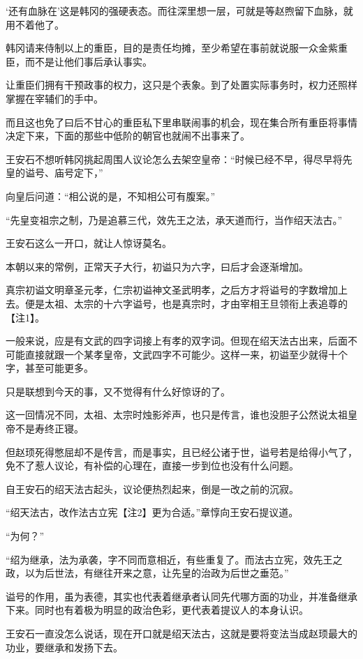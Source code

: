 ‘还有血脉在’这是韩冈的强硬表态。而往深里想一层，可就是等赵煦留下血脉，就用不着他了。

韩冈请来侍制以上的重臣，目的是责任均摊，至少希望在事前就说服一众金紫重臣，而不是让他们事后承认事实。

让重臣们拥有干预政事的权力，这只是个表象。到了处置实际事务时，权力还照样掌握在宰辅们的手中。

而且这也免了曰后不甘心的重臣私下里串联闹事的机会，现在集合所有重臣将事情决定下来，下面的那些中低阶的朝官也就闹不出事来了。

王安石不想听韩冈挑起周围人议论怎么去架空皇帝：“时候已经不早，得尽早将先皇的谥号、庙号定下，”

向皇后问道：“相公说的是，不知相公可有腹案。”

“先皇变祖宗之制，乃是追慕三代，效先王之法，承天道而行，当作绍天法古。”

王安石这么一开口，就让人惊讶莫名。

本朝以来的常例，正常天子大行，初谥只为六字，曰后才会逐渐增加。

真宗初谥文明章圣元孝，仁宗初谥神文圣武明孝，之后方才将谥号的字数增加上去。便是太祖、太宗的十六字谥号，也是真宗时，才由宰相王旦领衔上表追尊的【注1】。

一般来说，应是有文武的四字词接上有孝的双字词。但现在绍天法古出来，后面不可能直接就跟一个某孝皇帝，文武四字不可能少。这样一来，初谥至少就得十个字，甚至可能更多。

只是联想到今天的事，又不觉得有什么好惊讶的了。

这一回情况不同，太祖、太宗时烛影斧声，也只是传言，谁也没胆子公然说太祖皇帝不是寿终正寝。

但赵顼死得憋屈却不是传言，而是事实，且已经公诸于世，谥号若是给得小气了，免不了惹人议论，有补偿的心理在，直接一步到位也没有什么问题。

自王安石的绍天法古起头，议论便热烈起来，倒是一改之前的沉寂。

“绍天法古，改作法古立宪【注2】更为合适。”章惇向王安石提议道。

“为何？”

“绍为继承，法为承袭，字不同而意相近，有些重复了。而法古立宪，效先王之政，以为后世法，有继往开来之意，让先皇的治政为后世之垂范。”

谥号的作用，虽为表德，其实也代表着继承者认同先代哪方面的功业，并准备继承下来。同时也有着极为明显的政治色彩，更代表着提议人的本身认识。

王安石一直没怎么说话，现在开口就是绍天法古，这就是要将变法当成赵顼最大的功业，要继承和发扬下去。

